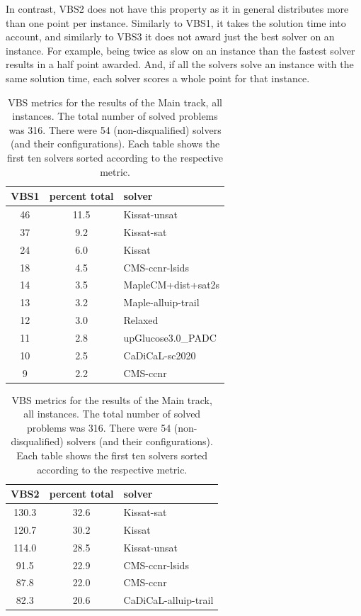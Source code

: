 \documentclass{elsarticle}
\begin{document}
In contrast, VBS2 does not have this property as it in general distributes more than one point per instance.
Similarly to VBS1, it takes the solution time into account,
and similarly to VBS3 it does not award just the best solver on an instance.
For example, being twice as slow on an instance than the fastest solver results in a half point awarded.
And, if all the solvers solve an instance with the same solution time,
each solver scores a whole point for that instance. 

\begin{table}
\caption{VBS metrics for the results of the Main track, all instances. 
The total number of solved problems was 316. 
There were 54 (non-disqualified) solvers (and their configurations).
Each table shows the first ten solvers sorted according to the respective metric.}
\label{tab:vbsMainALL}
\begin{center}
\begin{tabular}{ccl}
VBS1 & percent total & solver \\
\hline
46 & 11.5 & Kissat-unsat \\
37 & \phantom{0}9.2 & Kissat-sat \\
24 & \phantom{0}6.0 & Kissat \\
18 & \phantom{0}4.5 & CMS-ccnr-lsids \\
14 & \phantom{0}3.5 & MapleCM+dist+sat2s \\
13 & \phantom{0}3.2 & Maple-alluip-trail \\
12 & \phantom{0}3.0 & Relaxed \\
11 & \phantom{0}2.8 & upGlucose3.0\_PADC \\
10 & \phantom{0}2.5 & CaDiCaL-sc2020 \\
\phantom{0}9 & \phantom{0}2.2 & CMS-ccnr \\
\end{tabular}
\end{center}
\begin{center}
\begin{tabular}{ccl}
VBS2 & percent total & solver \\
\hline
130.3 & 32.6 & Kissat-sat \\
120.7 & 30.2 & Kissat \\
114.0 & 28.5 & Kissat-unsat \\
\phantom{0}91.5 & 22.9 & CMS-ccnr-lsids \\
\phantom{0}87.8 & 22.0 & CMS-ccnr \\
\phantom{0}82.3 & 20.6 & CaDiCaL-alluip-trail \\

\end{tabular}
\end{center}
\end{table}
\end{document}
